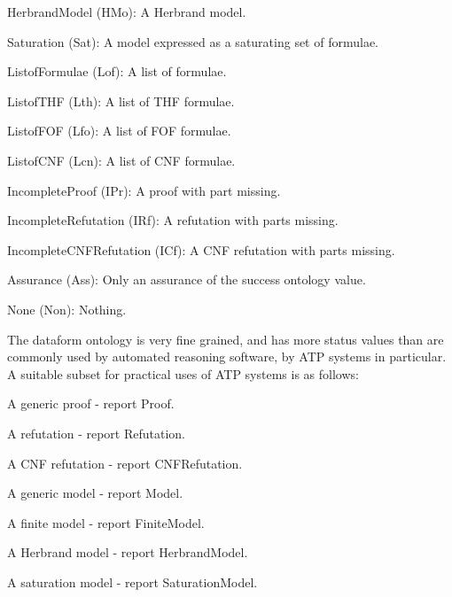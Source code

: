 \documentclass[a4paper]{easychair}
\newenvironment{packed_itemize}{
\vspace*{-0.5em}
\begin{itemize}
  \setlength{\partopsep}{0pt}
  \setlength{\itemsep}{1pt}
  \setlength{\parskip}{0pt}
  \setlength{\parsep}{0pt}
}{\end{itemize}}
\begin{document}
\begin{packed_itemize}
\item HerbrandModel (HMo):
      A Herbrand model.

\item Saturation (Sat):
      A model expressed as a saturating set of formulae.

\item ListofFormulae (Lof):
      A list of formulae.

\item ListofTHF (Lth):
      A list of THF formulae.

\item ListofFOF (Lfo):
      A list of FOF formulae.

\item ListofCNF (Lcn):
      A list of CNF formulae.

\item IncompleteProof (IPr):
      A proof with part missing.

\item IncompleteRefutation (IRf):
      A refutation with parts missing.

\item IncompleteCNFRefutation (ICf):
      A CNF refutation with parts missing.

\item Assurance (Ass):
      Only an assurance of the success ontology value.

\item None (Non):
      Nothing.

\end{packed_itemize}

The dataform ontology is very fine grained, and has more status values
than are commonly used by automated reasoning software, by ATP systems
in particular.
A suitable subset for practical uses of ATP systems is as follows:
\begin{packed_itemize}
\item A generic proof - report Proof.
\item A refutation - report Refutation.
\item A CNF refutation - report CNFRefutation.
\item A generic model - report Model.
\item A finite model - report FiniteModel.
\item A Herbrand model - report HerbrandModel.
\item A saturation model - report SaturationModel.
\end{packed_itemize}
\end{document}
